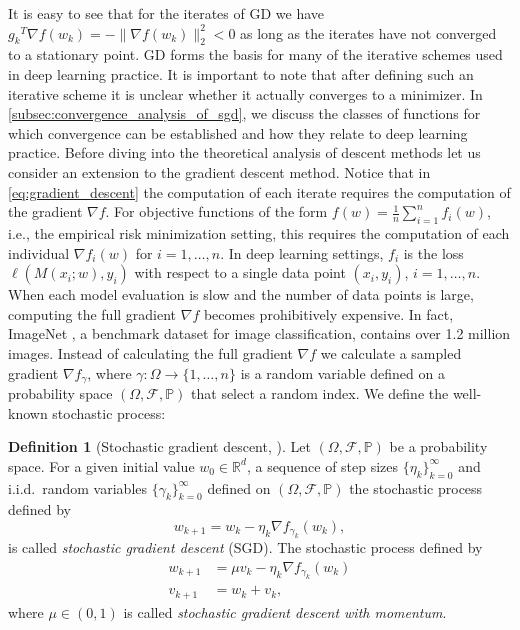 \documentclass[12pt]{article}
\theoremstyle{definition}
\newtheorem{definition}[definition]{Definition}
\numberwithin{equation}{section}
\newcommand{\R}{\mathbb{R}}
\newcommand{\BP}{\mathbb{P}}
\newcommand{\CF}{\mathcal{F}}
\newcommand{\ev}[1]{\mathbb{E}\left[{#1}\right]}
\newcommand{\norm}[1]{\lVert{#1}\rVert_2}
\begin{document}
It is easy to see that for the iterates of GD we have ${g_k}^T \nabla f(w_{k}) = -\norm{ \nabla f(w_{k}) }^2 < 0$ as long as the iterates have not converged to a stationary point. GD forms the basis for many of the iterative schemes used in deep learning practice. It is important to note that after defining such an iterative scheme it is unclear whether it actually converges to a minimizer. In \autoref{subsec:convergence_analysis_of_sgd}, we discuss the classes of functions for which convergence can be established and how they relate to deep learning practice. Before diving into the theoretical analysis of descent methods let us consider an extension to the gradient descent method.
Notice that in \eqref{eq:gradient_descent} the computation of each iterate requires the computation of the gradient $\nabla f$. For objective functions of the form $f(w) = \frac{1}{n} \sum_{i=1}^n f_i(w)$, i.e., the empirical risk minimization setting, this requires the computation of each individual $\nabla f_i(w)$ for $i = 1, \dots, n$. In deep learning settings, $f_i$ is the loss $\ell(M(x_i;w), y_i)$ with respect to a single data point $(x_i, y_i)$, $i=1,\dots,n$. When each model evaluation is slow and the number of data points is large, computing the full gradient $\nabla f$ becomes prohibitively expensive. In fact, ImageNet \cite{dengImageNetLargescaleHierarchical2009}, a benchmark dataset for image classification, contains over 1.2 million images. 
Instead of calculating the full gradient $\nabla f$ we calculate a sampled gradient $\nabla f_{\gamma}$, where $\gamma : \Omega \rightarrow \{1,\dots,n\}$ is a random variable defined on a probability space $(\Omega, \CF, \BP)$ that select a random index. We define the well-known stochastic process:
\begin{definition}[Stochastic gradient descent, ]
  \label{def:sgd}
 Let $(\Omega, \CF, \BP)$ be a probability space. For a given initial value $w_{0} \in \R^d$, a sequence of step sizes $\{\eta_k\}_{k=0}^\infty$ and i.i.d.\ random variables $\{\gamma_{k}\}_{k=0}^\infty$ defined on $(\Omega, \CF, \BP)$ the stochastic process defined by
  \begin{equation}
    \label{eq:stochastic_gradient_descent}
    w_{k+1} = w_{k} - \eta_k \nabla f_{\gamma_{k}}(w_{k}),
  \end{equation}
  is called \emph{stochastic gradient descent} (SGD).
  The stochastic process defined by
  \begin{align*}
    w_{k+1} &= \mu v_{k} - \eta_k \nabla f_{\gamma_{k}}(w_{k}) \\
    v_{k+1} &= w_{k} + v_{k},
  \end{align*}
  where $\mu \in (0,1)$ is called \emph{stochastic gradient descent with momentum}. 
\end{definition}
\end{document}
